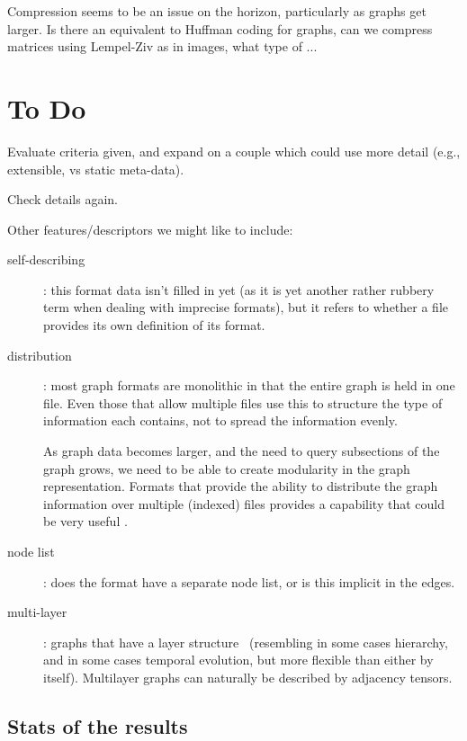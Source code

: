 \documentclass{sig-alternate}
\begin{document}
Compression seems to be an issue on the horizon, particularly as
graphs get larger. Is there an equivalent to Huffman coding for
graphs, can we compress matrices using Lempel-Ziv as in images, what
type of ...
 
\section{To Do}

Evaluate criteria given, and expand on a couple which could use more
detail (e.g., extensible, vs static meta-data).

Check details again.

Other features/descriptors we might like to include:

\begin{description}

\item[self-describing]: this format data isn't filled in yet (as it is
  yet another rather rubbery term when dealing with imprecise
  formats), but it refers to whether a file provides its own
  definition of its format.

\item[distribution]: most graph formats are monolithic in that the
  entire graph is held in one file. Even those that allow multiple
  files use this to structure the type of information each contains,
  not to spread the information evenly.

  As graph data becomes larger, and the need to query subsections of
  the graph grows, we need to be able to create modularity in the
  graph representation. Formats that provide the ability to distribute
  the graph information over multiple (indexed) files provides a
  capability that could be very useful \cite{bildhauer11:_dhhtg}.

\item[node list]: does the format have a separate node list, or is
  this implicit in the edges.

\item[multi-layer]: graphs that have a layer
  structure~\cite{kivela:_multil} (resembling in some cases hierarchy,
  and in some cases temporal evolution, but more flexible than either
  by itself). Multilayer graphs can naturally be described by
  adjacency tensors.

\end{description}



\subsection{Stats of the results}
\end{document}
